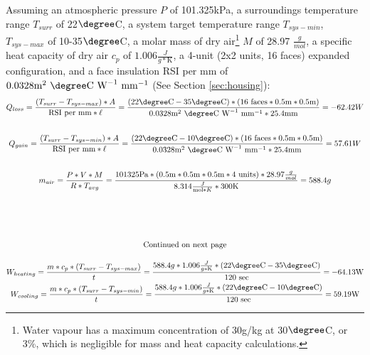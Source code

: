 Assuming an atmospheric pressure $P$ of 101.325kPa, a surroundings temperature range $T_{surr}$ of 22$\degree$C, a system target temperature range $T_{sys-min}$, $T_{sys-max}$ of 10-35$\degree$C, a molar mass of dry air\footnote{Water vapour has a maximum concentration of 30g/kg at 30$\degree$C, or 3\%, which is negligible for mass and heat capacity calculations.} $M$ of 28.97 $\frac g{mol}$, a specific heat capacity of dry air $c_p$ of $1.006 \frac{J}{g*\text{K}}$, a 4-unit (2x2 units, 16 faces) expanded configuration, and a face insulation RSI per mm of $0.0328\text{m}^2~  \degree \text{C}~\text{W}^{-1}~\text{mm}^{-1}$ (See Section \ref{sec:housing}):\\
\vspace{.05cm}
\begin{gather*}
    \label{eqn:heatloss}
    Q_{loss}=\frac{(T_{surr}-T_{sys-max}) * A}{\text{RSI per mm} * \ell}=\frac{(22\degree \text{C}-35\degree \text{C}) * (16 \text{ faces} * 0.5\text{m} * 0.5\text{m})}{0.0328 \text{m}^2~  \degree \text{C}~\text{W}^{-1}~\text{mm}^{-1} * 25.4 \text{mm}}=-62.42 W\\\vspace{.05cm}\\
    \label{eqn:heatgain}
    Q_{gain}=\frac{(T_{surr}-T_{sys-min}) * A}{\text{RSI per mm} * \ell}=\frac{(22\degree \text{C}-10\degree \text{C}) * (16 \text{ faces} * 0.5\text{m} * 0.5\text{m})}{0.0328 \text{m}^2~  \degree \text{C}~\text{W}^{-1}~\text{mm}^{-1} * 25.4 \text{mm}}=57.61 W\\\vspace{.05cm}\\
    \label{eqn:airmass}
    m_{air}=\frac{P*V*M}{R*T_{avg}}=\frac{101325\text{Pa}*(0.5\text{m}*0.5\text{m}*0.5\text{m}*4\text{ units})*28.97\frac g{mol}}{8.314\frac{J}{\text{mol}*K}*300\text{K}}=588.4g\\
    \vspace{1.5cm}\\
    \text{Continued on next page}
\end{gather*}
\vspace{1cm}

\begin{gather*}
  \label{eqn:heating}
  W_{heating}=\frac{m*c_p*(T_{surr}-T_{sys-max})}{t}=\frac{588.4g*1.006\frac{J}{g*\text{K}}*(22\degree \text{C}-35\degree \text{C})}{120\text{ sec}}=-64.13\text{W}\\
  \label{eqn:cooling}
  W_{cooling}=\frac{m*c_p*(T_{surr}-T_{sys-min})}{t}=\frac{588.4g*1.006\frac{J}{g*\text{K}}*(22\degree \text{C}-10\degree \text{C})}{120\text{ sec}}=59.19\text{W}
\end{gather*}

